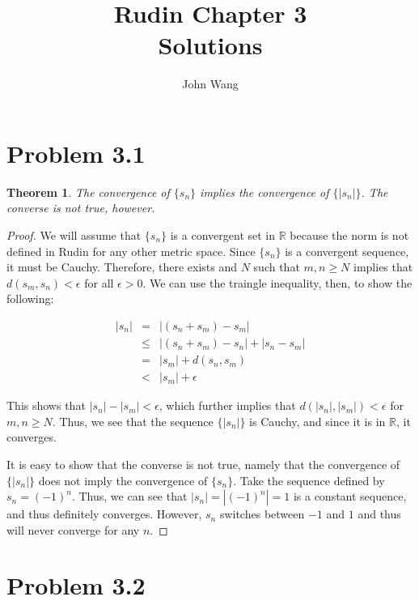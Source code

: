\documentclass[psamsfonts]{amsart}
\title{Rudin Chapter 3\\
Solutions }
\author{John Wang}
\newtheorem{thm}{Theorem}[section]
\theoremstyle{definition}
\theoremstyle{remark}
\numberwithin{equation}{section}
\begin{document}
\maketitle



\section{Problem 3.1}

\begin{thm}
The convergence of $\{ s_n \}$ implies the convergence of $\{ | s_n | \}$. The converse is not true, however.
\end{thm}

\begin{proof}
We will assume that $\{ s_n \}$ is a convergent set in $\mathbb{R}$ because the norm is not defined in Rudin for any other metric space. Since $\{ s_n \}$ is a convergent sequence, it must be Cauchy. Therefore, there exists and $N$ such that $m,n \geq N$ implies that $d(s_m,s_n) < \epsilon$ for all $\epsilon > 0$. We can use the traingle inequality, then, to show the following:

\begin{eqnarray}
|s_n| &=& |(s_n + s_m) - s_m | \\
& \leq & |(s_n + s_m) - s_n| + | s_n - s_m| \nonumber \\
&=& |s_m | + d(s_n,s_m) \nonumber \\
&<& |s_m| + \epsilon \nonumber
\end{eqnarray}

This shows that $|s_n| - |s_m| < \epsilon$, which further implies that $d(|s_n|,|s_m|) < \epsilon$ for $m,n \geq N$. Thus, we see that the sequence $\{ | s_n | \}$ is Cauchy, and since it is in $\mathbb{R}$, it converges.

It is easy to show that the converse is not true, namely that the convergence of $\{ |s_n | \}$ does not imply the convergence of $\{ s_n \}$. Take the sequence defined by $s_n = (-1)^n$. Thus, we can see that $|s_n| = |(-1)^n| = 1$ is a constant sequence, and thus definitely converges. However, $s_n$ switches between $-1$ and $1$ and thus will never converge for any $n$. 
 
\end{proof}

\section{Problem 3.2}
\end{document}
